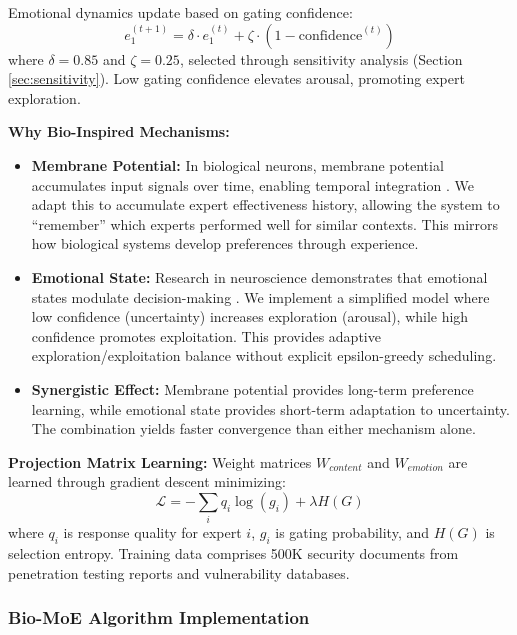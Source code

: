 \documentclass[preprint,12pt]{elsarticle}
\begin{document}
Emotional dynamics update based on gating confidence:
\begin{equation}
e_1^{(t+1)} = \delta \cdot e_1^{(t)} + \zeta \cdot (1 - \text{confidence}^{(t)})
\end{equation}
where $\delta = 0.85$ and $\zeta = 0.25$, selected through sensitivity analysis (Section \ref{sec:sensitivity}). Low gating confidence elevates arousal, promoting expert exploration.

\textbf{Why Bio-Inspired Mechanisms:}
\begin{itemize}
    \item \textbf{Membrane Potential:} In biological neurons, membrane potential accumulates input signals over time, enabling temporal integration \cite{kandel2013}. We adapt this to accumulate expert effectiveness history, allowing the system to ``remember'' which experts performed well for similar contexts. This mirrors how biological systems develop preferences through experience.
    \item \textbf{Emotional State:} Research in neuroscience demonstrates that emotional states modulate decision-making \cite{damasio1994}. We implement a simplified model where low confidence (uncertainty) increases exploration (arousal), while high confidence promotes exploitation. This provides adaptive exploration/exploitation balance without explicit epsilon-greedy scheduling.
    \item \textbf{Synergistic Effect:} Membrane potential provides long-term preference learning, while emotional state provides short-term adaptation to uncertainty. The combination yields faster convergence than either mechanism alone.
\end{itemize}

\textbf{Projection Matrix Learning:} Weight matrices $W_{content}$ and $W_{emotion}$ are learned through gradient descent minimizing:
\begin{equation}
\mathcal{L} = -\sum_{i} q_i \log(g_i) + \lambda H(G)
\end{equation}
where $q_i$ is response quality for expert $i$, $g_i$ is gating probability, and $H(G)$ is selection entropy. Training data comprises 500K security documents from penetration testing reports and vulnerability databases.

\subsubsection{Bio-MoE Algorithm Implementation}
\end{document}
